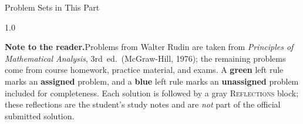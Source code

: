 \documentclass[main.tex]{subfiles}
\begin{document}

\begin{partcontents}[7.5em]{Problem Sets in This Part}
\end{partcontents}

\vspace{0.65\baselineskip}

\begin{spacing}{1.0}
{\small\noindent\textbf{Note to the reader.}\enspace Problems from Walter Rudin are taken from
\textit{Principles of Mathematical Analysis}, 3rd~ed.\ (McGraw-Hill, 1976); the remaining problems
come from course homework, practice material, and exams. A {\color{green!60!black}\textbf{green}}
left rule marks an \textbf{assigned} problem, and a {\color{hwUnassignedBlue}\textbf{blue}} left rule
marks an \textbf{unassigned} problem included for completeness. Each solution is followed by a gray
\textsc{Reflections} block; these reflections are the student's study notes and are \emph{not} part
of the official submitted solution.\par}
\end{spacing}
\vspace{0.4\baselineskip}
\end{document}
